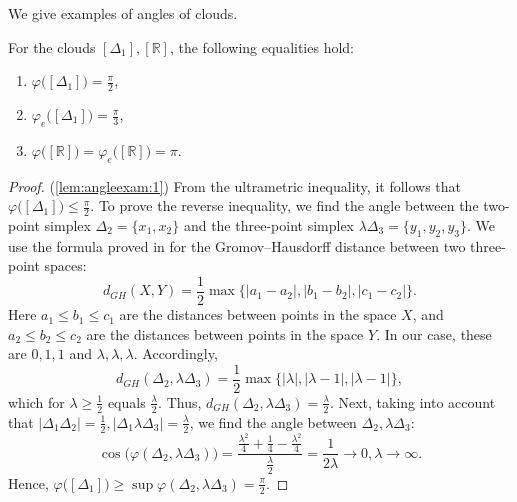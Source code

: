 \documentclass[leqno]{article}
\begin{document}
We give examples of angles of clouds.
\begin{lemma}
    For the clouds \( [\Delta _{1}], [\mathbb{R}] \), the following
    equalities hold: \label{lem:angleexam}
    \begin{enumerate}
        \item \( \varphi \big([\Delta _{1}]\big) = \frac{\pi }{2}
            \),\label{lem:angleexam:1}
        \item \( \varphi_e \big([\Delta _{1}]\big) = \frac{\pi }{3}
            \),\label{lem:angleexam:2}
        \item \( \varphi \big([\mathbb{R}]\big) = \varphi_e
            \big([\mathbb{R}]\big) = \pi  \).\label{lem:angleexam:3}
    \end{enumerate}
\end{lemma}
\begin{proof}
    (\ref{lem:angleexam:1}) From the ultrametric inequality, it follows that \(
    \varphi \big([\Delta _1]\big)\le \frac{\pi }{2} \). To prove the reverse
    inequality, we find the angle between the two-point simplex \( \Delta
    _{2} = \{x_1, x_2\} \) and the three-point simplex \(
    \lambda \Delta _3  = \{y_1,y_2, y_3\}\). We use the formula proved in
    \cite{ivanov2016} for the Gromov--Hausdorff distance
    between two three-point spaces:
    \[
        d_{GH}(X,Y) = \frac{1}{2} \max\big\{ |a_1 - a_2|,|b_1 - b_2|,|c_1
        - c_2|\big\}.
    \]
    Here \( a_1 \le b_1 \le c_1 \) are the distances between points in
    the space \( X \), and \( a_2 \le b_2 \le c_2 \) are the distances between
    points in the space \( Y \). In our case, these are \( 0,1,1 \) and \(
    \lambda , \lambda , \lambda . \) Accordingly,
    \[
        d_{GH}(\Delta_2, \lambda \Delta _{3}) =\frac{1}{2}
        \max\big\{|\lambda |, | \lambda  -1|, |\lambda -1|\big\},
    \]
    which
    for \( \lambda \ge \frac 1 2 \) equals \(\frac \lambda 2 \). Thus, \(d
        _{GH}(\Delta _2, \lambda \Delta _3) =
    \frac{\lambda }{2} \). Next, taking into account that \( |\Delta _1
        \Delta _2|=\frac{1}{2}, |\Delta _1 \lambda \Delta
    _3|=\frac{\lambda }{2} \), we find the angle between \( \Delta _2,
    \lambda \Delta _3 \):
    \[ \cos \big(\varphi (\Delta _2 , \lambda \Delta _3)\big)
        =\frac{\frac{\lambda ^2}{4} + \frac{1}{4} - \frac{\lambda
        ^2}{4}}{\frac{\lambda }{2}} = \frac{1}{2 \lambda }
        \rightarrow 0, \lambda \rightarrow \infty.
    \]
    Hence, \( \varphi \big([\Delta _1]\big) \ge \sup \varphi (\Delta _2,
    \lambda \Delta _3) = \frac \pi 2. \)


\end{proof}
\end{document}
